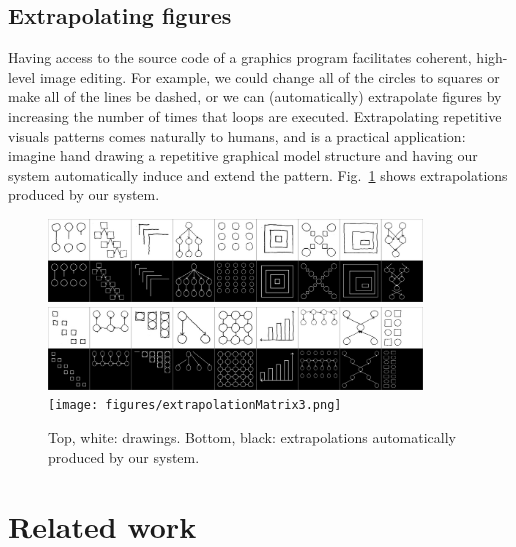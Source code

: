 \documentclass{article}
\theoremstyle{definition}
\begin{document}
\subsection{Extrapolating figures}
Having access to the source code of a graphics program facilitates coherent, high-level image editing.
For example,
we could change all of the circles to squares or make all of the lines be dashed,
or we can (automatically) extrapolate figures
by increasing the number of times that loops are executed.
Extrapolating repetitive visuals patterns comes naturally to humans,
and is a practical application:
imagine hand drawing a repetitive graphical model structure
and having our system automatically induce and extend the pattern.
Fig.~\ref{extrapolationFigure} shows extrapolations produced by our system.
\begin{figure}[H]\centering
  \includegraphics[width = 0.885\textwidth]{figures/extrapolationMatrix1.png}
  \includegraphics[width = 0.885\textwidth]{figures/extrapolationMatrix2.png}
  \texttt{[image: figures/extrapolationMatrix3.png]}  
   \caption{Top, white: drawings. Bottom, black: extrapolations automatically produced by our system.}
  \label{extrapolationFigure}\vspace{-0.5cm}
  \end{figure}
%





\section{Related work}
\end{document}
